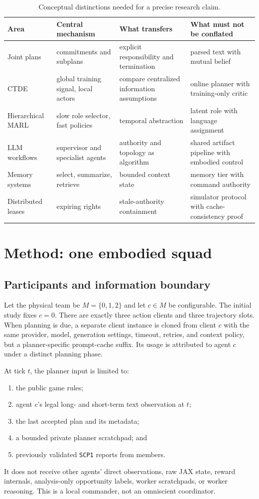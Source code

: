 \documentclass[11pt]{article}
\newcommand{\scp}{\texttt{SCP1}}
\begin{document}
\begin{table}[t]
\centering\small
\begin{tabularx}{\textwidth}{lXXX}
\toprule
Area & Central mechanism & What transfers & What must not be conflated\\
\midrule
Joint plans & commitments and subplans & explicit responsibility and termination & parsed text with mutual belief\\
CTDE & global training signal, local actors & compare centralized information assumptions & online planner with training-only critic\\
Hierarchical MARL & slow role selector, fast policies & temporal abstraction & latent role with language assignment\\
LLM workflows & supervisor and specialist agents & authority and topology as algorithm & shared artifact pipeline with embodied control\\
Memory systems & select, summarize, retrieve & bounded context state & memory tier with command authority\\
Distributed leases & expiring rights & stale-authority containment & simulator protocol with cache-consistency proof\\
\bottomrule
\end{tabularx}
\caption{Conceptual distinctions needed for a precise research claim.}
\label{tab:distinctions}
\end{table}

\section{Method: one embodied squad}

\subsection{Participants and information boundary}

Let the physical team be $M=\{0,1,2\}$ and let $c\in M$ be configurable.  The
initial study fixes $c=0$.  There are exactly three action clients and three
trajectory slots.  When planning is due, a separate client instance is cloned
from client $c$ with the same provider, model, generation settings, timeout,
retries, and context policy, but a planner-specific prompt-cache suffix.  Its
usage is attributed to agent $c$ under a distinct planning phase.

At tick $t$, the planner input is limited to:
\begin{enumerate}
  \item the public game rules;
  \item agent $c$'s legal long- and short-term text observation at $t$;
  \item the last accepted plan and its metadata;
  \item a bounded private planner scratchpad; and
  \item previously validated \scp{} reports from members.
\end{enumerate}
It does not receive other agents' direct observations, raw JAX state, reward
internals, analysis-only opportunity labels, worker scratchpads, or worker
reasoning.  This is a local commander, not an omniscient coordinator.
\end{document}
